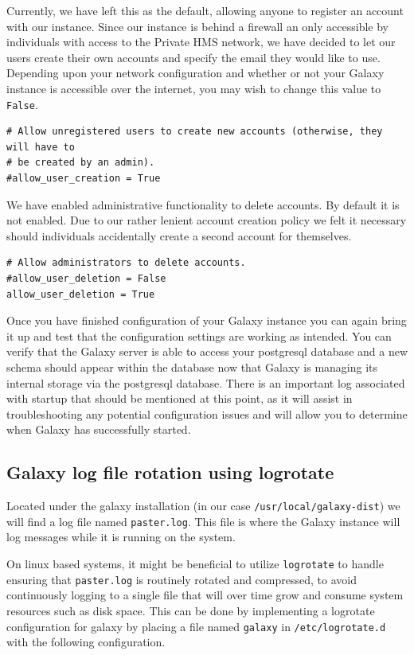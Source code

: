 \documentclass[a4paper,10pt]{article}
\begin{document}
Currently, we have left this as the default, allowing anyone to register an account with our instance.  Since our instance is behind a firewall an only accessible by individuals with access to the Private HMS network, we have decided to let our users create their own accounts and specify the email they would like to use.  Depending upon your network configuration and whether or not your Galaxy instance is accessible over the internet, you may wish to change this value to \texttt{False}.
\begin{lstlisting}
# Allow unregistered users to create new accounts (otherwise, they will have to
# be created by an admin).
#allow_user_creation = True
\end{lstlisting}

We have enabled administrative functionality to delete accounts.  By default it is not enabled.  Due to our rather lenient account creation policy we felt it necessary should individuals accidentally create a second account for themselves.
\begin{lstlisting}
# Allow administrators to delete accounts.
#allow_user_deletion = False
allow_user_deletion = True
\end{lstlisting}

Once you have finished configuration of your Galaxy instance you can again bring it up and test that the configuration settings are working as intended.  You can verify that the Galaxy server is able to access your postgresql database and a new schema should appear within the database now that Galaxy is managing its internal storage via the postgresql database.  There is an important log associated with startup that should be mentioned at this point, as it will assist in troubleshooting any potential configuration issues and will allow you to determine when Galaxy has successfully started.

\subsection{Galaxy log file rotation using logrotate}
Located under the galaxy installation (in our case \texttt{\footnotesize{/usr/local/galaxy-dist}})  we will find a log file named \texttt{\footnotesize{paster.log}}.  This file is where the Galaxy instance will log messages while it is running on the system.

On linux based systems, it might be beneficial to utilize \texttt{\footnotesize{logrotate}} to handle ensuring that \texttt{\footnotesize{paster.log}} is routinely rotated and compressed, to avoid continuously logging to a single file that will over time grow and consume system resources such as disk space.  This can be done by implementing a logrotate configuration for galaxy by placing a file named \texttt{\footnotesize{galaxy}} in \texttt{\footnotesize{/etc/logrotate.d}} with the following configuration.
\end{document}
